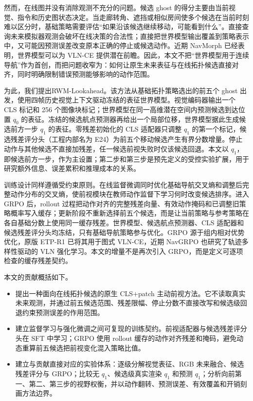 \documentclass[UTF8,11pt]{ctexart}
\newcommand{\method}{RWM-Lookahead}
\begin{document}
然而，在线图并没有消除观测不充分的问题。候选 ghost 的得分主要由当前视觉、指令和历史图状态决定。当走廊转角、遮挡或相似房间使多个候选在当前时刻难以区分时，基础策略需要评估“如果沿该候选继续移动，可能看到什么”。直接查询未来模拟器观测会破坏在线决策的合法性；直接把世界模型输出覆盖到策略表示中，又可能因预测误差改变原本正确的停止或候选动作。近期 NavMorph 已经表明，世界模型可以为 VLN-CE 提供潜在前瞻\cite{yao2025navmorph}。因此，本文不把“世界模型用于连续导航”作为首创，而把问题收窄为：如何让原生未来表征与在线拓扑候选直接对齐，同时明确限制错误预测能够影响的动作范围。

为此，我们提出\method{}。该方法从基础拓扑策略选出的前五个 ghost 出发，使用四帧历史视觉上下文驱动冻结的表征世界模型。视觉编码器输出一个 CLS 标记和 256 个图像块标记；世界模型在同一高维潜在空间内预测候选到达位置 $q_0$ 的表征。冻结的候选航点预测器再给出一个局部位移，世界模型据此生成候选前方一步 $q_1$ 的表征。零残差初始化的 CLS 适配器只调整 $q_1$ 的第一个标记，候选残差评分头（工程内部名为 E24）为前五个移动候选产生有界分数增量。停止动作与其他候选不直接加残差，任一候选前视失败时仅该候选回退。本文以 $q_1$，即候选前方一步，作为主设置；第二步和第三步是预先定义的受控实验扩展，用于研究额外信息、误差累积和推理成本的关系。

训练设计同样遵循受约束原则。在线监督微调同时优化基础导航交叉熵和调整后完整动作分布的交叉熵，使前视模块在教师动作监督下学习何时改变候选排序。进入 GRPO 后，rollout 过程把动作对齐的完整残差向量、有效动作掩码和已调整旧策略概率写入缓存；更新阶段不重新选择前五个候选，而是让当前策略与参考策略在各自基础分数上使用同一缓存残差。世界模型、候选航点预测器、CLS 适配器和候选残差评分头均冻结，只有基础导航策略参与优化。GRPO 源于组内相对优势优化\cite{shao2024deepseekmath}，原版 ETP-R1 已将其用于图式 VLN-CE\cite{ye2025etpr1}，近期 NavGRPO 也研究了轨迹多样性驱动的 VLN 强化学习\cite{li2026navgrpo}。本文的增量不是再次引入 GRPO，而是定义可逐项检查的缓存残差契约。

本文的贡献概括如下。
\begin{itemize}
  \item 提出一种面向在线拓扑候选的原生 CLS+patch 主动前视方法。它不读取真实未来观测，并通过前五候选范围、残差限幅、停止分数不直接改写和候选级回退约束预测误差的作用范围。
  \item 建立监督学习与强化微调之间可复现的训练契约。前视适配器与候选残差评分头在 SFT 中学习；GRPO 使用 rollout 缓存的动作对齐残差和掩码，避免动态重算前五候选把前视变化混入策略比值。
  \item 建立与贡献直接对应的实验体系：逐级分解视觉表征、RGB 未来融合、候选残差评分与 GRPO；比较无 $q_1$、候选级真实渲染 $q_1$ 和预测 $q_1$；分析向前第一、第二、第三步的视野权衡，并以动作翻转、预测误差、有效覆盖和开销刻画方法边界。
\end{itemize}
\end{document}
